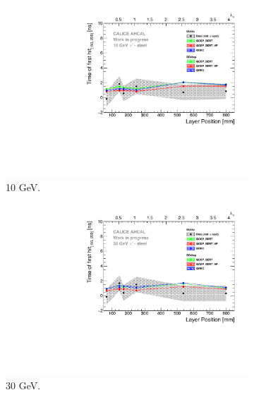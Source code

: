 \begin{figure}[htbp!]
	\begin{subfigure}[t]{0.5\textwidth}
		\centering
		\includegraphics[width=1\textwidth]{chap5/fig_AHCAL_timing/Pions/ComparisonToSim/Time_Depth_10GeV.pdf}
		\caption{10 GeV.}\label{fig:Depth_SimData_10GeV}
	\end{subfigure}
	\hfill
	\begin{subfigure}[t]{0.5\textwidth}
		\centering
		\includegraphics[width=1\textwidth]{chap5/fig_AHCAL_timing/Pions/ComparisonToSim/Time_Depth_30GeV.pdf}
		\caption{30 GeV.} \label{fig:Depth_SimData_30GeV}
	\end{subfigure}
	\hfill
	\begin{subfigure}[t]{0.5\textwidth}
		\centering

\end{subfigure}
\end{figure}
